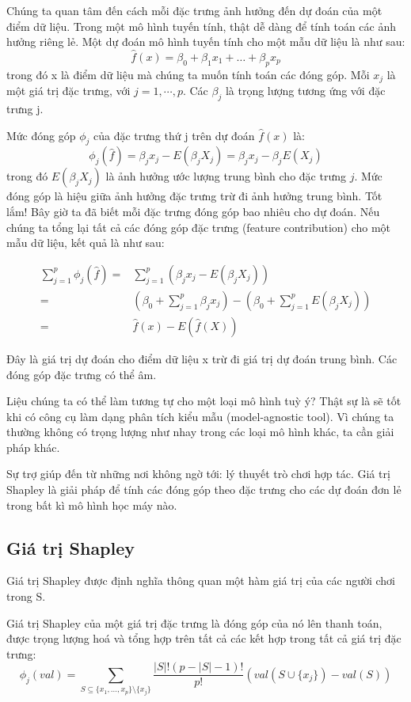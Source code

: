 Chúng ta quan tâm đến cách mỗi đặc trưng ảnh hưởng đến dự đoán của một điểm dữ liệu. Trong một mô hình tuyến tính, thật dễ dàng để tính toán các ảnh hưởng riêng lẻ. Một dự đoán mô hình tuyến tính cho một mẫu dữ liệu là như sau:
$$ \hat{f}(x)=\beta_0+\beta_{1}x_{1}+\ldots+\beta_{p}x_{p}$$
trong đó x là điểm dữ liệu mà chúng ta muốn tính toán các đóng góp. Mỗi $x_j$ là một giá trị đặc trưng, với $j = 1, \cdots, p$. Các $\beta_j$ là trọng lượng tương ứng với đặc trưng j.

Mức đóng góp $\phi_j$ của đặc trưng thứ j trên dự đoán $ \hat{f}(x) $ là:
$$ \phi_j(\hat{f})=\beta_{j}x_j-E(\beta_{j}X_{j})=\beta_{j}x_j-\beta_{j}E(X_{j})$$
trong đó $E(\beta_jX_{j})$ là ảnh hưởng ước lượng trung bình cho đặc trưng $j$. Mức đóng góp là hiệu giữa ảnh hưởng đặc trưng trừ đi ảnh hưởng trung bình. Tốt lắm! Bây giờ ta đã biết mỗi đặc trưng đóng góp bao nhiêu cho dự đoán. Nếu chúng ta tổng lại tất cả các đóng góp đặc trưng (feature contribution) cho một mẫu dữ liệu, kết quả là như sau:

\begin{align*}
\sum_{j=1}^{p}\phi_j(\hat{f})=&\sum_{j=1}^p(\beta_{j}x_j-E(\beta_{j}X_{j}))\\=&(\beta_0+\sum_{j=1}^p\beta_{j}x_j)-(\beta_0+\sum_{j=1}^{p}E(\beta_{j}X_{j}))\\=&\hat{f}(x)-E(\hat{f}(X))
\end{align*}

Đây là giá trị dự đoán cho điểm dữ liệu x trừ đi giá trị dự đoán trung bình. Các đóng góp đặc trưng có thể âm.

Liệu chúng ta có thể làm tương tự cho một loại mô hình tuỳ ý? Thật sự là sẽ tốt khi có công cụ làm dạng phân tích kiểu mẫu (model-agnostic tool). Vì chúng ta thường không có trọng lượng như nhay trong các loại mô hình khác, ta cần giải pháp khác.

Sự trợ giúp đến từ những nơi không ngờ tới: lý thuyết trò chơi hợp tác. Giá trị Shapley là giải pháp để tính các đóng góp theo đặc trưng cho các dự đoán đơn lẻ trong bất kì mô hình học máy nào.

\subsection{ Giá trị Shapley}

Giá trị Shapley được định nghĩa thông quan một hàm giá trị của các người chơi trong S.

Giá trị Shapley của một giá trị đặc trưng là đóng góp của nó lên thanh toán, được trọng lượng hoá và tổng hợp trên tất cả các kết hợp trong tất cả giá trị đặc trưng:
$$ \phi_j(val)=\sum_{S\subseteq\{x_{1},\ldots,x_{p}\}\setminus\{x_j\}}\frac{|S|!\left(p-|S|-1\right)!}{p!}\left(val\left(S\cup\{x_j\}\right)-val(S)\right)$$

